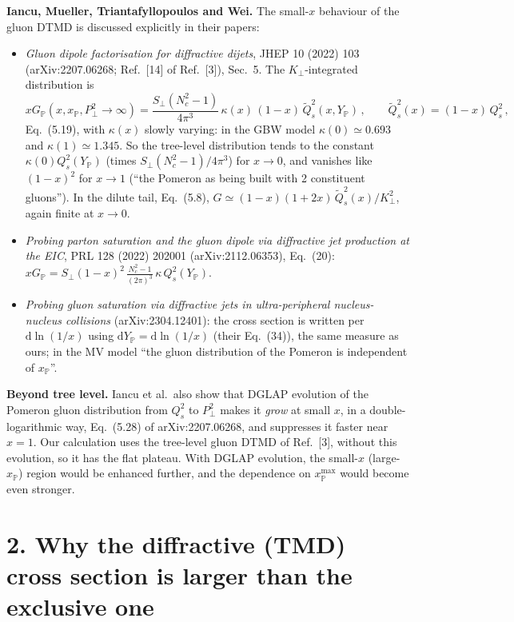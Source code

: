 \documentclass[12pt]{article}
\newcommand{\xpo}{x_{\mathbb{P}}}
\begin{document}
\textbf{Iancu, Mueller, Triantafyllopoulos and Wei.} The small-$x$ behaviour of the gluon DTMD is
discussed explicitly in their papers:
\begin{itemize}
\item \emph{Gluon dipole factorisation for diffractive dijets}, JHEP 10 (2022) 103
  (arXiv:2207.06268; Ref.~[14] of Ref.~[3]), Sec.~5. The $K_\perp$-integrated distribution is
  \[
    xG_{\mathbb{P}}(x,\xpo,P_\perp^2\to\infty)=\frac{S_\perp(N_c^2-1)}{4\pi^3}\,\kappa(x)\,(1-x)\,\tilde Q_s^2(x,Y_{\mathbb{P}})\,,
    \qquad\tilde Q_s^2(x)=(1-x)\,Q_s^2\,,
  \]
  Eq.~(5.19), with $\kappa(x)$ slowly varying: in the GBW model $\kappa(0)\simeq0.693$ and
  $\kappa(1)\simeq1.345$. So the tree-level distribution tends to the constant $\kappa(0)Q_s^2(Y_{\mathbb{P}})$
  (times $S_\perp(N_c^2-1)/4\pi^3$) for $x\to0$, and vanishes like $(1-x)^2$ for $x\to1$ (``the
  Pomeron as being built with 2 constituent gluons''). In the dilute tail, Eq.~(5.8),
  $G\simeq(1-x)(1+2x)\,\tilde Q_s^2(x)/K_\perp^2$, again finite at $x\to0$.
\item \emph{Probing parton saturation and the gluon dipole via diffractive jet production at the
  EIC}, PRL 128 (2022) 202001 (arXiv:2112.06353), Eq.~(20): $xG_{\mathbb{P}}=S_\perp(1-x)^2\,
  \frac{N_c^2-1}{(2\pi)^3}\,\kappa\,Q_s^2(Y_{\mathbb{P}})$.
\item \emph{Probing gluon saturation via diffractive jets in ultra-peripheral nucleus-nucleus
  collisions} (arXiv:2304.12401): the cross section is written per $\mathrm{d}\ln(1/x)$ using
  $\mathrm{d}Y_{\mathbb{P}}=\mathrm{d}\ln(1/x)$ (their Eq.~(34)), the same measure as ours; in the MV
  model ``the gluon distribution of the Pomeron is independent of $\xpo$''.
\end{itemize}

\textbf{Beyond tree level.} Iancu et al.\ also show that DGLAP evolution of the Pomeron gluon
distribution from $Q_s^2$ to $P_\perp^2$ makes it \emph{grow} at small $x$, in a double-logarithmic way,
Eq.~(5.28) of arXiv:2207.06268, and suppresses it faster near $x=1$. Our calculation uses the
tree-level gluon DTMD of Ref.~[3], without this evolution, so it has the flat plateau. With DGLAP
evolution, the small-$x$ (large-$\xpo$) region would be enhanced further, and the dependence on
$\xpo^{\max}$ would become even stronger.

\section*{2. Why the diffractive (TMD) cross section is larger than the exclusive one}
\end{document}

